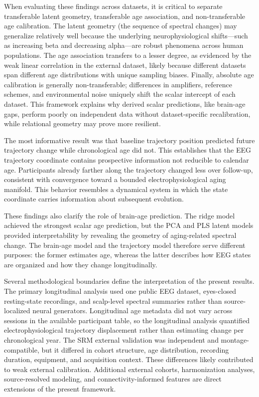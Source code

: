 \documentclass[journal]{IEEEtran}
\begin{document}
When evaluating these findings across datasets, it is critical to separate transferable latent geometry, transferable age association, and non-transferable age calibration. The latent geometry (the sequence of spectral changes) may generalize relatively well because the underlying neurophysiological shifts—such as increasing beta and decreasing alpha—are robust phenomena across human populations. The age association transfers to a lesser degree, as evidenced by the weak linear correlation in the external dataset, likely because different datasets span different age distributions with unique sampling biases. Finally, absolute age calibration is generally non-transferable; differences in amplifiers, reference schemes, and environmental noise uniquely shift the scalar intercept of each dataset. This framework explains why derived scalar predictions, like brain-age gaps, perform poorly on independent data without dataset-specific recalibration, while relational geometry may prove more resilient.

The most informative result was that baseline trajectory position predicted future trajectory change while chronological age did not. This establishes that the EEG trajectory coordinate contains prospective information not reducible to calendar age. Participants already farther along the trajectory changed less over follow-up, consistent with convergence toward a bounded electrophysiological aging manifold. This behavior resembles a dynamical system in which the state coordinate carries information about subsequent evolution.

These findings also clarify the role of brain-age prediction. The ridge model achieved the strongest scalar age prediction, but the PCA and PLS latent models provided interpretability by revealing the geometry of aging-related spectral change. The brain-age model and the trajectory model therefore serve different purposes: the former estimates age, whereas the latter describes how EEG states are organized and how they change longitudinally.

Several methodological boundaries define the interpretation of the present results. The primary longitudinal analysis used one public EEG dataset, eyes-closed resting-state recordings, and scalp-level spectral summaries rather than source-localized neural generators. Longitudinal age metadata did not vary across sessions in the available participant table, so the longitudinal analysis quantified electrophysiological trajectory displacement rather than estimating change per chronological year. The SRM external validation was independent and montage-compatible, but it differed in cohort structure, age distribution, recording duration, equipment, and acquisition context. These differences likely contributed to weak external calibration. Additional external cohorts, harmonization analyses, source-resolved modeling, and connectivity-informed features are direct extensions of the present framework.
\end{document}
